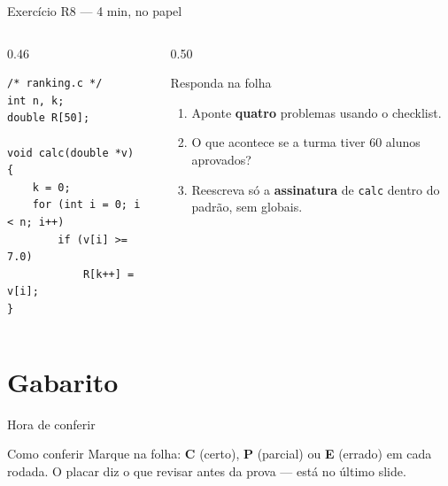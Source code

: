 \documentclass[aspectratio=169]{beamer}
\begin{document}
\begin{frame}[fragile]{Exercício R8 --- 4 min, no papel}
  \begin{columns}[T]
    \begin{column}{0.46\textwidth}
\begin{lstlisting}[style=numC]
/* ranking.c */
int n, k;
double R[50];

void calc(double *v)
{
    k = 0;
    for (int i = 0; i < n; i++)
        if (v[i] >= 7.0)
            R[k++] = v[i];
}
\end{lstlisting}
    \end{column}
    \begin{column}{0.50\textwidth}
      \begin{block}{Responda na folha}
        \small
        \begin{enumerate}
          \item[(a)] Aponte \textbf{quatro} problemas usando o checklist.
          \item[(b)] O que acontece se a turma tiver 60 alunos aprovados?
          \item[(c)] Reescreva só a \textbf{assinatura} de \texttt{calc}
            dentro do padrão, sem globais.
        \end{enumerate}
      \end{block}
    \end{column}
  \end{columns}
\end{frame}

\section{Gabarito}

\begin{frame}{Hora de conferir}
  \begin{block}{Como conferir}
    Marque na folha: \textbf{C} (certo), \textbf{P} (parcial) ou \textbf{E}
    (errado) em cada rodada. O placar diz o que revisar antes da prova ---
    está no último slide.
  \end{block}
\end{frame}
\end{document}
